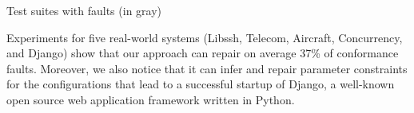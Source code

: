 \begin{table}[!hb]
	\caption{Test suites with faults (in gray)}\label{table:testsandfaults}
	\centering
\end{table}

Experiments for five real-world systems (Libssh, Telecom, Aircraft, Concurrency, and Django) show that our approach can repair on average 37\% of conformance faults. Moreover, we also notice that it can infer and repair parameter constraints for the configurations that lead to a successful startup of Django, a well-known open source web application framework written in Python.



